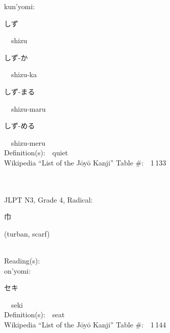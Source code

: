 \begin{multicols}{2}
{\hspace*{1em}}kun'yomi:\ \ \\
{\hspace*{2em}}{\begin{CJK}{UTF8}{min} しず \end{CJK}}\ \ shizu\ \ \\
{\hspace*{2em}}{\begin{CJK}{UTF8}{min} しず-か \end{CJK}}\ \ shizu-ka\ \ \\
{\hspace*{2em}}{\begin{CJK}{UTF8}{min} しず-まる \end{CJK}}\ \ shizu-maru\ \ \\
{\hspace*{2em}}{\begin{CJK}{UTF8}{min} しず-める \end{CJK}}\ \ shizu-meru\ \ \\
Definition(s):\ \ quiet \\
Wikipedia ``List of the J\=oy\=o Kanji'' Table \#:\ \ 1\,133 \\
\ \ \\
{\fontsize{34pt}{40pt}  }\ \ \\  %
{JLPT N3, Grade 4, Radical:\ \ {\begin{CJK}{UTF8}{min} 巾 \end{CJK}} (turban, scarf) } \\
Reading(s):\ \ \\
{\hspace*{1em}}on'yomi:\ \ \\
{\hspace*{2em}}{\begin{CJK}{UTF8}{min} セキ \end{CJK}}\ \ seki\ \ \\
Definition(s):\ \ seat \\
Wikipedia ``List of the J\=oy\=o Kanji'' Table \#:\ \ 1\,144 \\
\ \ \\
{\fontsize{34pt}{40pt}  }\ \ \\  %

\end{multicols}
